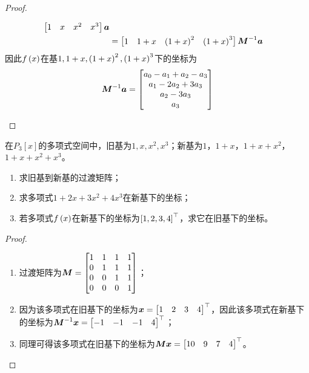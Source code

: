 \begin{proof}
\begin{enumerate}
{\begin{align*}
                  \begin{bmatrix}
                      1 & x & x^2 & x^3
                  \end{bmatrix}\boldsymbol{a} \\
                   & =
                  \begin{bmatrix}
                      1 & 1+x & \left( 1+x \right)^2 & \left( 1+x \right)^3
                  \end{bmatrix}{\boldsymbol{M}}^{-1}\boldsymbol{a}
              \end{align*}
              因此\(f\left( x \right)\)在基\(1,1+x,\left( 1+x \right)^2,\left( 1+x \right)^3\)下的坐标为
              \begin{equation*}
                  {\boldsymbol{M}}^{-1}\boldsymbol{a}=
                  \begin{bmatrix}
                      a_0-a_1+a_2-a_3 \\
                      a_1-2a_2+3a_3   \\
                      a_2-3a_3        \\
                      a_3
                  \end{bmatrix}
              \end{equation*}
              }
    \end{enumerate}
\end{proof}

\begin{problem}
在\(P_3[x]\)的多项式空间中，旧基为\(1,x,x^2,x^3\)；新基为\(1\)，\(1+x\)，\(1+x+x^2\)，\(1+x+x^2+x^3\)。
\begin{enumerate}
    \item 求旧基到新基的过渡矩阵；
    \item 求多项式\(1+2x+3x^2+4x^3\)在新基下的坐标；
    \item 若多项式\(f\left( x \right)\)在新基下的坐标为\(\left[ 1,2,3,4 \right]^\top\)，求它在旧基下的坐标。
\end{enumerate}
\end{problem}
\begin{proof}
    \begin{enumerate}
        \item 过渡矩阵为\(\boldsymbol{M}=\begin{bmatrix}1&1&1&1\\0&1&1&1\\0&0&1&1\\0&0&0&1\end{bmatrix}\)；
        \item 因为该多项式在旧基下的坐标为\(\boldsymbol{x}=\begin{bmatrix}1&2&3&4\end{bmatrix}^\top\)，因此该多项式在新基下的坐标为\({\boldsymbol{M}}^{-1}\boldsymbol{x}=\begin{bmatrix}-1&-1&-1&4\end{bmatrix}^\top\)；
        \item 同理可得该多项式在旧基下的坐标为\(\boldsymbol{M}\boldsymbol{x}=\begin{bmatrix}10&9&7&4\end{bmatrix}^\top\)。
    \end{enumerate}
\end{proof}

